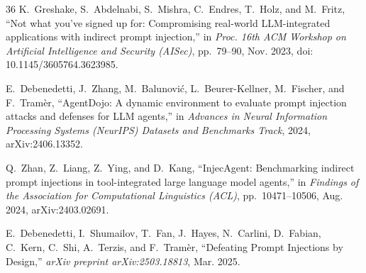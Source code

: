 \documentclass[conference,10pt]{IEEEtran}
\begin{document}
\begin{thebibliography}{36}
K.~Greshake, S.~Abdelnabi, S.~Mishra, C.~Endres, T.~Holz, and M.~Fritz, ``Not what you've signed up for: Compromising real-world LLM-integrated applications with indirect prompt injection,'' in \emph{Proc. 16th ACM Workshop on Artificial Intelligence and Security (AISec)}, pp.~79--90, Nov. 2023, doi: 10.1145/3605764.3623985.

E.~Debenedetti, J.~Zhang, M.~Balunovi{\'c}, L.~Beurer-Kellner, M.~Fischer, and F.~Tram{\`e}r, ``AgentDojo: A dynamic environment to evaluate prompt injection attacks and defenses for LLM agents,'' in \emph{Advances in Neural Information Processing Systems (NeurIPS) Datasets and Benchmarks Track}, 2024, arXiv:2406.13352.

Q.~Zhan, Z.~Liang, Z.~Ying, and D.~Kang, ``InjecAgent: Benchmarking indirect prompt injections in tool-integrated large language model agents,'' in \emph{Findings of the Association for Computational Linguistics (ACL)}, pp.~10471--10506, Aug. 2024, arXiv:2403.02691.

E.~Debenedetti, I.~Shumailov, T.~Fan, J.~Hayes, N.~Carlini, D.~Fabian, C.~Kern, C.~Shi, A.~Terzis, and F.~Tram{\`e}r, ``Defeating Prompt Injections by Design,'' \emph{arXiv preprint arXiv:2503.18813}, Mar. 2025.

\end{thebibliography}
\end{document}
